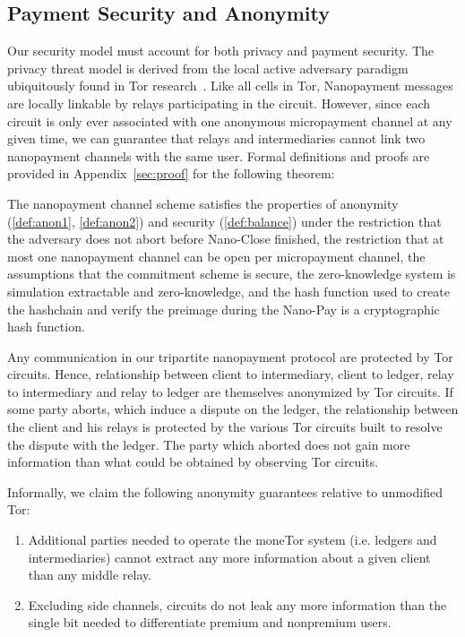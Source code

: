 \subsection{Payment Security and Anonymity}
\label{subsec:paysecurity}
Our security model must account for both privacy and payment security. The
privacy threat model is derived from the local active adversary paradigm
ubiquitously found in Tor research~\cite{dingledine2004tor}. Like all cells in
Tor, Nanopayment messages are locally linkable by relays participating in the
circuit. However, since each circuit is only ever associated with one anonymous
micropayment channel at any given time, we can guarantee that relays and
intermediaries cannot link two nanopayment channels with the same user. Formal
definitions and proofs are provided in Appendix~\ref{sec:proof} for the following theorem:

\begin{theorem}
The nanopayment channel scheme satisfies the properties of anonymity (\ref{def:anon1}, \ref{def:anon2})
 and security (\ref{def:balance}) under the restriction that the adversary does not abort before Nano-Close finished, the restriction that at most one nanopayment channel can be open per micropayment channel, the assumptions that the commitment scheme is secure, the zero-knowledge system is simulation extractable and zero-knowledge, and the hash function used to create the hashchain and verify the preimage during the Nano-Pay is a cryptographic hash function.

\end{theorem}

Any communication in
our tripartite nanopayment protocol are protected by Tor circuits. Hence,
relationship between client to intermediary, client to ledger, relay to
intermediary and relay to ledger are themselves anonymized by Tor circuits. If
some party aborts, which induce a dispute on the ledger, the relationship
between the client and his relays is protected by the various Tor circuits built
to resolve the dispute with the ledger. The party which aborted does not gain more information than what could be obtained by observing Tor circuits.

Informally, we claim the following anonymity guarantees relative to unmodified Tor:

\begin{enumerate}
\item Additional parties needed to operate the moneTor system (i.e. ledgers and
  intermediaries) cannot extract any more information about a given client than
  any middle relay.
\item Excluding side channels, circuits do not leak any more information than
  the single bit needed to differentiate premium and nonpremium users.
\end{enumerate}

